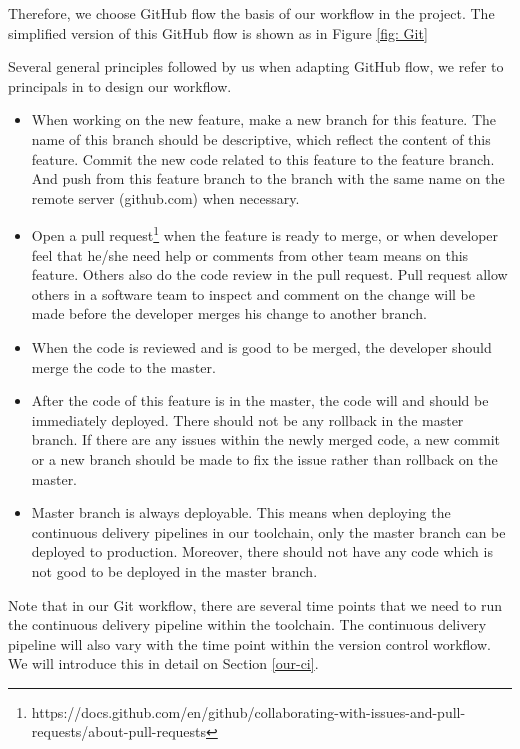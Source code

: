 Therefore, we choose GitHub flow \cite{chacongithub} the basis of our workflow in the project. The simplified version of this GitHub flow is shown as in Figure \ref{fig: Git} 
\par
Several general principles followed by us when adapting GitHub flow, we refer to principals in \cite{chacongithub} to design our workflow.
\begin{itemize}
\item When working on the new feature, make a new branch for this feature. The name of this branch should be descriptive, which reflect the content of this feature. Commit the new code related to this feature to the feature branch. And push from this feature branch to the branch with the same name on the remote server (github.com) when necessary.
\item Open a pull request\footnote{https://docs.github.com/en/github/collaborating-with-issues-and-pull-requests/about-pull-requests} when the feature is ready to merge, or when developer feel that he/she need help or comments from other team means on this feature. Others also do the code review in the pull request. Pull request allow others in a software team to inspect and comment on the change will be made before the developer merges his change to another branch.
\item When the code is reviewed and is good to be merged, the developer should merge the code to the master.
\item After the code of this feature is in the master, the code will and should be immediately deployed. There should not be any rollback in the master branch. If there are any issues within the newly merged code, a new commit or a new branch should be made to fix the issue rather than rollback on the master.
\item Master branch is always deployable. This means when deploying the continuous delivery pipelines in our toolchain, only the master branch can be deployed to production. Moreover, there should not have any code which is not good to be deployed in the master branch.
\end{itemize}
\par
Note that in our Git workflow, there are several time points that we need to run the continuous delivery pipeline within the toolchain. The continuous delivery pipeline will also vary with the time point within the version control workflow. We will introduce this in detail on Section \ref{our-ci}.
